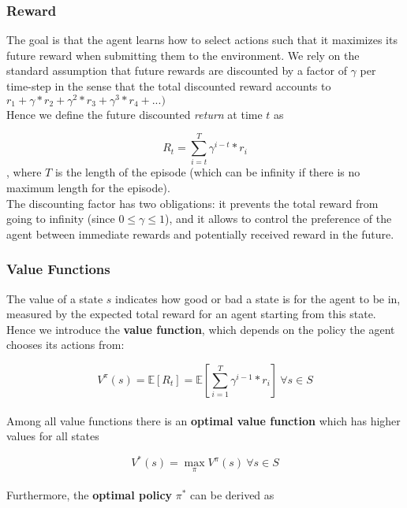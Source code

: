 \subsubsection{Reward}

The goal is that the agent learns how to select actions such that it maximizes its future reward when submitting them to the environment.
We rely on the standard assumption that future rewards are discounted by a factor of $\gamma$ per time-step in the sense that the total discounted reward accounts to $r_1 + \gamma*r_2 + \gamma^2*r_3 + \gamma^3*r_4 + ...)$
\\
Hence we define the future discounted \textit{return} at time $t$ as 

\begin{equation}\label{eq:discounted-return}
R_t=\sum_{i=t}^{T}{\gamma^{i-t}{*}r_{i}}
\end{equation}
, where $T$ is the length of the episode (which can be infinity if there is no maximum length for the episode).
\\
The discounting factor has two obligations: it prevents the total reward from going to infinity (since $0 \leq \gamma \leq 1$), and it allows to control the preference of the agent between immediate rewards and potentially received reward in the future. \cite{rl-demysitifed2}

\subsubsection{Value Functions}

The value of a state $s$ indicates how good or bad a state is for the agent to be in, measured by the expected total reward for an agent starting from this state. Hence we introduce the \textbf{value function}, which depends on the policy the agent chooses its actions from:

\begin{equation}\label{eq:value-function}
V^{\pi}(s)=\mathbb{E}[R_t]=\mathbb{E}[\sum_{i=1}^{T}{\gamma^{i-1}{*}r_{i}}]\ \forall s \in S
\end{equation}
\\
Among all value functions there is an \textbf{optimal value function} which has higher values for all states

\begin{equation}\label{eq:optimal-value-function}
V^{*}(s)=\max_{\pi}V^{\pi}(s)\ \forall s \in S
\end{equation}
\\
Furthermore, the \textbf{optimal policy} $\pi^*$ can be derived as

